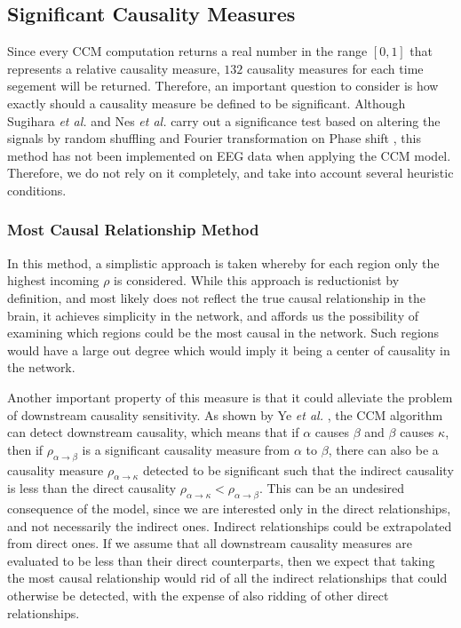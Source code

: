 \documentclass[journal,12pt,onecolumn,draftclsnofoot]{IEEEtran}  %
\begin{document}

\subsection{Significant Causality Measures}
\label{subsec:significant_causality}
Since every CCM computation returns a real number in the range $[0,1]$ that represents a relative causality measure, $132$ causality measures for each time segement will be returned. Therefore, an important question to consider is how exactly should a causality measure be defined to be significant. Although Sugihara \textit{\textit{et al.}} \cite{Sugihara2012} and Nes \textit{et al.} \cite{Nes2015} carry out a significance test based on altering the signals by random shuffling and Fourier transformation on Phase shift \cite{Ebisuzaki1997}, this method has not been implemented on EEG data when applying the CCM model. Therefore, we do not rely on it completely, and take into account several heuristic conditions.


\subsubsection{Most Causal Relationship Method}
In this method, a simplistic approach is taken whereby for each region only the highest incoming $\rho$ is considered. While this approach is reductionist by definition, and most likely does not reflect the true causal relationship in the brain, it achieves simplicity in the network, and affords us the possibility of examining which regions could be the most causal in the network. Such regions would have a large out degree which would imply it being a center of causality in the network.

Another important property of this measure is that it could alleviate the problem of downstream causality sensitivity. As shown by Ye \textit{\textit{et al.}} \cite{Ye2015}, the CCM algorithm can detect downstream causality, which means that if $\alpha$ causes $\beta$ and $\beta$ causes $\kappa$, then if $\rho_{\alpha \rightarrow \beta}$ is a significant causality measure from $\alpha$ to $\beta$, there can also be a causality measure $\rho_{\alpha \rightarrow \kappa}$ detected to be significant such that the indirect causality is less than the direct causality $\rho_{\alpha \rightarrow \kappa} < \rho_{\alpha \rightarrow \beta}$. This can be an undesired consequence of the model, since we are interested only in the direct relationships, and not necessarily the indirect ones. Indirect relationships could be extrapolated from direct ones. If we assume that all downstream causality measures are evaluated to be less than their direct counterparts, then we expect that taking the most causal relationship would rid of all the indirect relationships that could otherwise be detected, with the expense of also ridding of other direct relationships.
\end{document}
